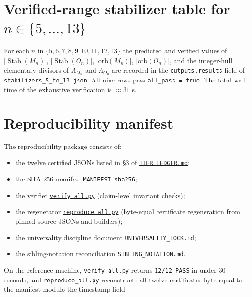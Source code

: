 \documentclass[11pt,a4paper]{article}
\theoremstyle{definition}
\theoremstyle{remark}
\providecommand{\Stab}{\operatorname{Stab}}
\begin{document}
\section{\texorpdfstring{Verified-range stabilizer table for $n \in \{5, \dots, 13\}$}{Verified-range stabilizer table for n=5..13}}
\label{app:stab-table}

For each $n$ in $\{5, 6, 7, 8, 9, 10, 11, 12, 13\}$ the
predicted and verified values of $|\Stab(M_n)|$, $|\Stab(O_n)|$,
$|\mathrm{orb}(M_n)|$, $|\mathrm{orb}(O_n)|$, and the integer-hull
elementary divisors of $\Lambda_{M_n}$ and $\Lambda_{O_n}$ are
recorded in the \texttt{outputs.results} field of
\texttt{stabilizers\_5\_to\_13.json}. All nine rows pass
\texttt{all\_pass = true}. The total wall-time of the exhaustive
verification is $\approx 31$ s.

\section{Reproducibility manifest}\label{app:repro}

The reproducibility package consists of:
\begin{itemize}[leftmargin=*]
   \item the twelve certified JSONs listed in §3 of
   \href{../certified/TIER_LEDGER.md}{\texttt{TIER\_LEDGER.md}};
   \item the SHA-256 manifest
   \href{../certified/MANIFEST.sha256}{\texttt{MANIFEST.sha256}};
   \item the verifier
   \href{../certified/verify_all.py}{\texttt{verify\_all.py}}
   (claim-level invariant checks);
   \item the regenerator
   \href{../certified/reproduce_all.py}{\texttt{reproduce\_all.py}}
   (byte-equal certificate regeneration from pinned source JSONs and builders);
   \item the universality discipline document
   \href{../certified/UNIVERSALITY_LOCK.md}{\texttt{UNIVERSALITY\_LOCK.md}};
   \item the sibling-notation reconciliation
   \href{../certified/SIBLING_NOTATION.md}{\texttt{SIBLING\_NOTATION.md}}.
\end{itemize}
On the reference machine, \texttt{verify\_all.py} returns
\texttt{12/12 PASS} in under $30$ seconds, and
\texttt{reproduce\_all.py} reconstructs all twelve certificates
byte-equal to the manifest modulo the timestamp field.



\end{document}
